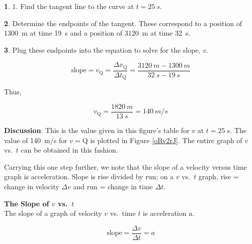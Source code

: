\documentclass[dvipsnames]{article}
\begin{document}
\vspace{1em}

\textbf{1}. 1. Find the tangent line to the curve at $t = \SI{25}{s}$.

\vspace{1em}

\textbf{2}. Determine the endpoints of the tangent. These correspond to a position of \SI{1300}{m} at time \SI{19}{s} and a position of \SI{3120}{m} at time \SI{32}{s}.

\vspace{1em}

\textbf{3}. Plug these endpoints into the equation to solve for the slope, $v$.

\begin{equation*}
    \text{slope} = v_{\text{Q}} = \frac{\Delta x_{\text{Q}}}{\Delta t_{\text{Q}}} = \frac{\SI{3120}{m} - \SI{1300}{m}}{\SI{32}{s} - \SI{19}{s}}
\end{equation*}

Thus,

\begin{equation*}
    v_{\text{Q}} = \frac{\SI{1820}{m}}{\SI{13}{s}} = \SI{140}{m/s}
\end{equation*}

\textbf{Discussion}: This is the value given in this figure's table for $v$ at  $t = \SI{25}{s}$. The value of \SI{140}{m/s} for $v={\text{Q}}$ is plotted in Figure \ref{oRv2rJ}. The entire graph of $v$ vs.~$t$ can be obtained in this fashion.

\vspace{1ex}

\endsolution

\vspace{1em}

Carrying this one step further, we note that the slope of a velocity versus time graph is acceleration. Slope is rise divided by run; on a $v$ vs.~$t$ graph, rise = change in velocity $\Delta v$ and run = change in time $\Delta t$.

\begin{mdframed}[backgroundcolor=black!10]
    \textbf{The Slope of $v$ vs.~$t$}\\
    The slope of a graph of velocity $v$ vs.~time $t$ is acceleration $a$.

    \begin{equation*}
        \text{slope} = \frac{\Delta v}{\Delta t} = a
    \end{equation*}
\end{mdframed}
\end{document}
